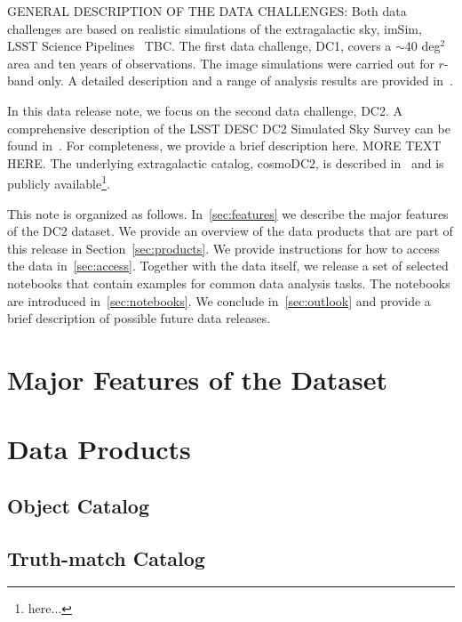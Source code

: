 \documentclass[11pt]{report}
\begin{document}
GENERAL DESCRIPTION OF THE DATA CHALLENGES: Both data challenges are based on realistic simulations of the extragalactic sky, imSim, LSST Science Pipelines~\citep{2017ASPC..512..279J} TBC. The first data challenge, DC1, covers a $\sim$40 deg$^2$ area and ten years of observations. The image simulations were carried out for $r$-band only. A detailed description and a range of analysis results are provided in~\cite{dc1}. 

In this data release note, we focus on the second data challenge, DC2. A comprehensive description of the LSST DESC DC2 Simulated Sky Survey can be found in~\cite{2020arXiv201005926L}. For completeness, we provide a brief description here. MORE TEXT HERE. The underlying extragalactic catalog, cosmoDC2, is described in~\cite{korytov} and is publicly available\footnote{here...}.



This note is organized as follows. In~\autoref{sec:features} we describe the major features of the DC2 dataset.
We provide an overview of the data products that are part of this release in Section~\autoref{sec:products}.
We provide instructions for how to access the data in~\autoref{sec:access}.
Together with the data itself, we release a set of selected notebooks that contain examples for common data analysis tasks.
The notebooks are introduced in~\autoref{sec:notebooks}.
We conclude in~\ref{sec:outlook} and provide a brief description of possible future data releases. 

\section{Major Features of the Dataset}
\label{sec:features}

\section{Data Products}
\label{sec:products}

\subsection{Object Catalog}



\subsection{Truth-match Catalog}
\end{document}
